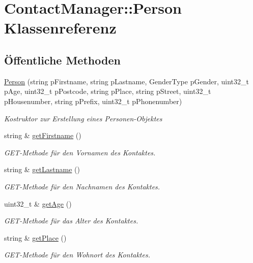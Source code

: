 \hypertarget{classContactManager_1_1Person}{}\section{Contact\+Manager\+:\+:Person Klassenreferenz}
\label{classContactManager_1_1Person}
\subsection*{Öffentliche Methoden}
\begin{DoxyCompactItemize}
\item 
\hyperlink{classContactManager_1_1Person_a7e15c64ecd91d9fe3a86089296a96119}{Person} (string p\+Firstname, string p\+Lastname, Gender\+Type p\+Gender, uint32\+\_\+t p\+Age, uint32\+\_\+t p\+Postcode, string p\+Place, string p\+Street, uint32\+\_\+t p\+Housenumber, string p\+Prefix, uint32\+\_\+t p\+Phonenumber)
\begin{DoxyCompactList}\small\item\em Kostruktor zur Erstellung eines Personen-\/\+Objektes\end{DoxyCompactList}\item 
string \& \hyperlink{classContactManager_1_1Person_abaf0c8225bed1c63d3fc8edf39c091cb}{get\+Firstname} ()
\begin{DoxyCompactList}\small\item\em G\+E\+T-\/\+Methode für den Vornamen des Kontaktes.\end{DoxyCompactList}\item 
string \& \hyperlink{classContactManager_1_1Person_a7be599e567469609abc206c4e20b1ef3}{get\+Lastname} ()
\begin{DoxyCompactList}\small\item\em G\+E\+T-\/\+Methode für den Nachnamen des Kontaktes.\end{DoxyCompactList}\item 
uint32\+\_\+t \& \hyperlink{classContactManager_1_1Person_a785d2a902e5fb396adf21e3a69718edd}{get\+Age} ()
\begin{DoxyCompactList}\small\item\em G\+E\+T-\/\+Methode für das Alter des Kontaktes.\end{DoxyCompactList}\item 
string \& \hyperlink{classContactManager_1_1Person_abc73080d9a92362af3ef25183d7186e5}{get\+Place} ()
\begin{DoxyCompactList}\small\item\em G\+E\+T-\/\+Methode für den Wohnort des Kontaktes.\end{DoxyCompactList}\item 

\end{DoxyCompactItemize}
